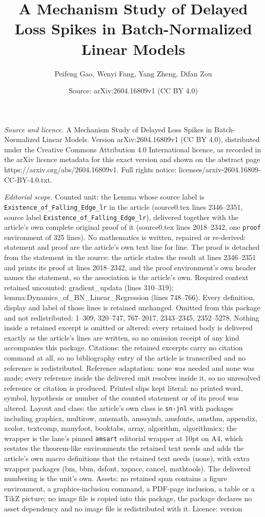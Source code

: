 \documentclass[10pt,a4paper]{amsart}
\title[A Mechanism Study of Delayed Loss Spikes in Batch-Normalized]{A Mechanism Study of Delayed Loss Spikes in Batch-Normalized Linear Models}
\author{Peifeng Gao, Wenyi Fang, Yang Zheng, Difan Zou}
\date{Source: arXiv:2604.16809v1 (CC BY 4.0)}
\begin{document}
\maketitle

\noindent\emph{Source and licence.} A Mechanism Study of Delayed Loss Spikes in Batch-Normalized Linear Models. Version arXiv:2604.16809v1 (CC BY 4.0), distributed under the Creative Commons Attribution 4.0 International licence, as recorded in the arXiv licence metadata for this exact version and shown on the abstract page https://arxiv.org/abs/2604.16809v1. Full rights notice: licenses/arxiv-2604.16809-CC-BY-4.0.txt.\par\smallskip

\noindent\textit{Editorial scope.} Counted unit: the Lemma whose source label is \texttt{Existence\_of\_Falling\_Edge\_lr} in the article (source0.tex lines 2346--2351, source label \texttt{Existence\_of\_Falling\_Edge\_lr}), delivered together with the article's own complete original proof of it (source0.tex lines 2018--2342, one \texttt{proof} environment of 325 lines). No mathematics is written, repaired or re-derived: statement and proof are the article's own text line for line. The proof is detached from the statement in the source: the article states the result at lines 2346--2351 and prints its proof at lines 2018--2342, and the proof environment's own header names the statement, so the association is the article's own. Required context retained uncounted: gradient\_updata (lines 310--319); lemma:Dynamics\_of\_BN\_Linear\_Regression (lines 748--766). Every definition, display and label of those lines is retained unchanged. Omitted from this package and not redistributed: 1--309, 320--747, 767--2017, 2343--2345, 2352--5278. Nothing inside a retained excerpt is omitted or altered: every retained body is delivered exactly as the article's lines are written, so no omission receipt of any kind accompanies this package. Citations: the retained excerpts carry no citation command at all, so no bibliography entry of the article is transcribed and no reference is redistributed. Reference adaptation: none was needed and none was made; every reference inside the delivered unit resolves inside it, so no unresolved reference or citation is produced. Printed slips kept literal: no printed word, symbol, hypothesis or number of the counted statement or of its proof was altered. Layout and class: the article's own class is \texttt{sn-jnl} with packages including graphicx, multirow, amsmath, amssymb, amsfonts, amsthm, appendix, xcolor, textcomp, manyfoot, booktabs, array, algorithm, algorithmicx; the wrapper is the lane's pinned \texttt{amsart} editorial wrapper at 10pt on A4, which restates the theorem-like environments the retained text needs and adds the article's own macro definitions that the retained text needs (none), with extra wrapper packages (bm, bbm, dsfont, xspace, cancel, mathtools). The delivered numbering is the unit's own. Assets: no retained span contains a figure environment, a graphics-inclusion command, a PDF-page inclusion, a table or a TikZ picture; no image file is copied into this package, the package declares no asset dependency and no image file is redistributed with it. Licence: version 
\end{document}
